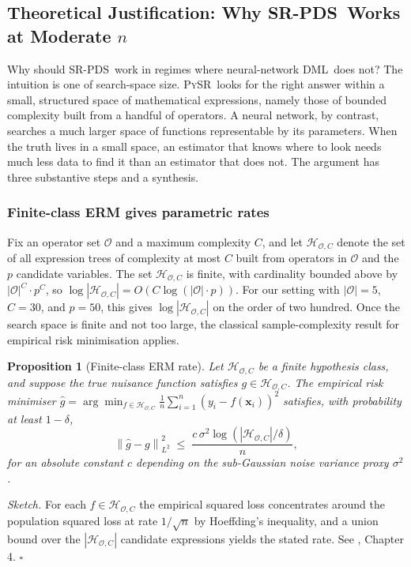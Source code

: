 \documentclass[11pt, a4paper]{article}
\theoremstyle{plain}
\newtheorem{proposition}[theorem]{Proposition}
\theoremstyle{definition}
\theoremstyle{remark}
\newcommand{\dml}{\textsc{DML}}
\newcommand{\pysr}{\textsc{PySR}}
\newcommand{\epds}{\textsc{SR-PDS}}
\newcommand{\norm}[1]{\left\lVert #1 \right\rVert}
\newcommand{\Hcal}{\mathcal{H}_{\mathcal{O}, C}}
\begin{document}
\subsection{Theoretical Justification: Why \epds\ Works at Moderate $n$}
\label{sec:theory}

Why should \epds\ work in regimes where neural-network \dml\
does not? The intuition is one of search-space size. \pysr\
looks for the right answer within a small, structured space of
mathematical expressions, namely those of bounded complexity
built from a handful of operators. A neural network, by
contrast, searches a much larger space of functions representable
by its parameters. When the truth lives in a small space, an
estimator that knows where to look needs much less data to find
it than an estimator that does not. The argument has three
substantive steps and a synthesis.

\subsubsection{Finite-class ERM gives parametric rates}

Fix an
operator set $\mathcal{O}$ and a maximum complexity $C$, and let
$\Hcal$ denote the set of all expression trees of complexity at
most $C$ built from operators in $\mathcal{O}$ and the $p$
candidate variables. The set $\Hcal$ is finite, with cardinality
bounded above by $|\mathcal{O}|^C \cdot p^C$, so $\log |\Hcal| =
O(C \log(|\mathcal{O}| \cdot p))$. For our setting with
$|\mathcal{O}| = 5$, $C = 30$, and $p = 50$, this gives $\log
|\Hcal|$ on the order of two hundred. Once the search space is
finite and not too large, the classical sample-complexity
result for empirical risk minimisation applies.

\begin{samepage}
\begin{proposition}[Finite-class ERM rate]
\label{prop:erm}
Let $\Hcal$ be a finite hypothesis class, and suppose the true
nuisance function satisfies $g \in \Hcal$. The empirical risk
minimiser
$\hat{g} = \arg\min_{f \in \Hcal} \tfrac{1}{n}
\sum_{i=1}^n (y_i - f(\bm{x}_i))^2$
satisfies, with probability at least $1 - \delta$,
\begin{equation*}
    \norm{\hat{g} - g}^2_{L^2}
    \;\leq\;
    \frac{c \, \sigma^2 \log(|\Hcal|/\delta)}{n},
\end{equation*}
for an absolute constant $c$ depending on the sub-Gaussian
noise variance proxy $\sigma^2$.
\end{proposition}

\emph{Sketch.} For each $f \in \Hcal$ the empirical squared loss
concentrates around the population squared loss at rate
$1/\sqrt{n}$ by Hoeffding's inequality, and a union bound over
the $|\Hcal|$ candidate expressions yields the stated rate. See
\citet{wainwright2019high}, Chapter 4. $\square$
\end{samepage}
\end{document}
